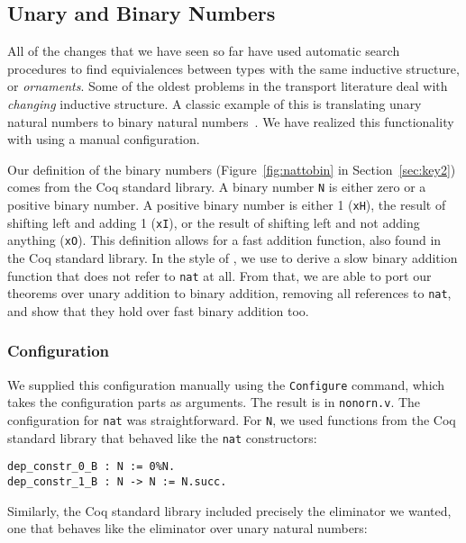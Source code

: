 \subsection{Unary and Binary Numbers}
\label{sec:bin}

All of the changes that we have seen so far have used automatic search procedures
to find equivialences between types with the same inductive structure, or \textit{ornaments}.
Some of the oldest problems in the transport literature deal with \textit{changing} inductive
structure.
A classic example of this is translating unary natural numbers to binary natural numbers~\cite{magaud2000changing}.
We have realized this functionality with \toolname using a manual configuration. %

Our definition of the binary numbers (Figure~\ref{fig:nattobin} in Section~\ref{sec:key2}) comes from the Coq standard library.
A binary number \lstinline{N} is either zero or a positive binary number. A positive binary number
is either 1 (\lstinline{xH}), the result of shifting left and adding 1 (\lstinline{xI}),
or the result of shifting left and not adding anything (\lstinline{xO}).
This definition allows for a fast addition function, also found in the Coq standard library.
In the style of \citet{magaud2000changing}, we use \toolname to derive a slow binary
addition function that does not refer to \lstinline{nat} at all.
From that, we are able to port our theorems over unary addition to binary addition,
removing all references to \lstinline{nat}, and show that they hold over fast binary addition too.

\subsubsection{Configuration}
We supplied this configuration manually using the \lstinline{Configure} command,
which takes the configuration parts as arguments.
The result is in \lstinline{nonorn.v}.
The configuration for \lstinline{nat} was straightforward.
For \lstinline{N}, we used functions from the Coq standard library that
behaved like the \lstinline{nat} constructors:

\begin{lstlisting}
dep_constr_0_B : N := 0%N.
dep_constr_1_B : N -> N := N.succ.
\end{lstlisting}
Similarly, the Coq standard library included precisely the eliminator we wanted, one that behaves
like the eliminator over unary natural numbers:

